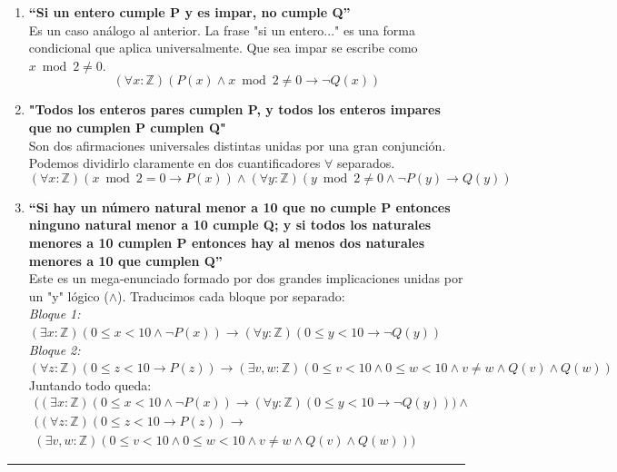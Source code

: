 \begin{enumerate}[label=\textbf{\alph*)}]
    \vspace{0.4cm}
    \item \textbf{“Si un entero cumple P y es impar, no cumple Q”} \\
    Es un caso análogo al anterior. La frase "si un entero..." es una forma condicional que aplica universalmente. Que sea impar se escribe como $x \bmod 2 \neq 0$.
    \[ (\forall x: \mathbb{Z})(P(x) \wedge x \bmod 2 \neq 0 \rightarrow \neg Q(x)) \]

    \vspace{0.4cm}
    \item \textbf{"Todos los enteros pares cumplen P, y todos los enteros impares que no cumplen P cumplen Q"} \\
    Son dos afirmaciones universales distintas unidas por una gran conjunción. Podemos dividirlo claramente en dos cuantificadores $\forall$ separados.
    \[ (\forall x: \mathbb{Z})(x \bmod 2 = 0 \rightarrow P(x)) \wedge (\forall y: \mathbb{Z})(y \bmod 2 \neq 0 \wedge \neg P(y) \rightarrow Q(y)) \]

    \vspace{0.4cm}
    \item \textbf{“Si hay un número natural menor a 10 que no cumple P entonces ninguno natural menor a 10 cumple Q; y si todos los naturales menores a 10 cumplen P entonces hay al menos dos naturales menores a 10 que cumplen Q”} \\
    Este es un mega-enunciado formado por dos grandes implicaciones unidas por un "y" lógico ($\wedge$). Traducimos cada bloque por separado: \\
    \textit{Bloque 1:} $(\exists x: \mathbb{Z})(0 \leq x < 10 \wedge \neg P(x)) \rightarrow (\forall y: \mathbb{Z})(0 \leq y < 10 \rightarrow \neg Q(y))$ \\
    \textit{Bloque 2:} $(\forall z: \mathbb{Z})(0 \leq z < 10 \rightarrow P(z)) \rightarrow (\exists v, w: \mathbb{Z})(0 \leq v < 10 \wedge 0 \leq w < 10 \wedge v \neq w \wedge Q(v) \wedge Q(w))$ \\
    Juntando todo queda:
    \begin{multline*}
    \Big( (\exists x: \mathbb{Z})(0 \leq x < 10 \wedge \neg P(x)) \rightarrow (\forall y: \mathbb{Z})(0 \leq y < 10 \rightarrow \neg Q(y)) \Big) \wedge \\
    \Big( (\forall z: \mathbb{Z})(0 \leq z < 10 \rightarrow P(z)) \rightarrow \\
    (\exists v, w: \mathbb{Z})(0 \leq v < 10 \wedge 0 \leq w < 10 \wedge v \neq w \wedge Q(v) \wedge Q(w)) \Big)
    \end{multline*}

\end{enumerate}

\vspace{0.5cm}
\hrule
\vspace{0.5cm}